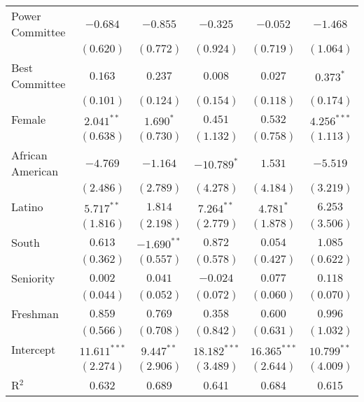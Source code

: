 \documentclass[12pt]{article}
\begin{document}
\begin{table}[H]
\begin{center}
\begin{tabular}{l c c c c c }
			Power Committee       & $-0.684$       & $-0.855$      & $-0.325$       & $-0.052$       & $-1.468$      \\
			& $(0.620)$      & $(0.772)$     & $(0.924)$      & $(0.719)$      & $(1.064)$     \\
			Best Committee        & $0.163$        & $0.237$       & $0.008$        & $0.027$        & $0.373^{*}$   \\
			& $(0.101)$      & $(0.124)$     & $(0.154)$      & $(0.118)$      & $(0.174)$     \\
			Female                 & $2.041^{**}$   & $1.690^{*}$   & $0.451$        & $0.532$        & $4.256^{***}$ \\
			& $(0.638)$      & $(0.730)$     & $(1.132)$      & $(0.758)$      & $(1.113)$     \\
			African American                   & $-4.769$       & $-1.164$      & $-10.789^{*}$  & $1.531$        & $-5.519$      \\
			& $(2.486)$      & $(2.789)$     & $(4.278)$      & $(4.184)$      & $(3.219)$     \\
			Latino                 & $5.717^{**}$   & $1.814$       & $7.264^{**}$   & $4.781^{*}$    & $6.253$       \\
			& $(1.816)$      & $(2.198)$     & $(2.779)$      & $(1.878)$      & $(3.506)$     \\
			South                  & $0.613$        & $-1.690^{**}$ & $0.872$        & $0.054$        & $1.085$       \\
			& $(0.362)$      & $(0.557)$     & $(0.578)$      & $(0.427)$      & $(0.622)$     \\
			Seniority              & $0.002$        & $0.041$       & $-0.024$       & $0.077$        & $0.118$       \\
			& $(0.044)$      & $(0.052)$     & $(0.072)$      & $(0.060)$      & $(0.070)$     \\
			Freshman               & $0.859$        & $0.769$       & $0.358$        & $0.600$        & $0.996$       \\
			& $(0.566)$      & $(0.708)$     & $(0.842)$      & $(0.631)$      & $(1.032)$     \\
			Intercept            & $11.611^{***}$ & $9.447^{**}$  & $18.182^{***}$ & $16.365^{***}$ & $10.799^{**}$ \\
			& $(2.274)$      & $(2.906)$     & $(3.489)$      & $(2.644)$      & $(4.009)$     \\
			\hline
			R$^2$                  & 0.632          & 0.689         & 0.641          & 0.684          & 0.615         \\

\end{tabular}
\end{center}
\end{table}
\end{document}
